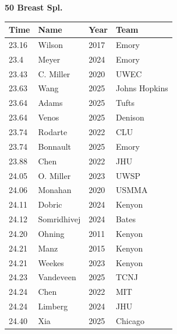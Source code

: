 \noindent\begin{minipage}[t]{0.98\textwidth}
\centering
\textbf{\textcolor{teamprimary}{50 Breast Spl.}}\par
\vspace{0.5em}
\centering
\small
\renewcommand{\arraystretch}{1.0}
\setlength{\tabcolsep}{4pt}
\begin{tabular}{@{}p{2.5cm}p{4.5cm}p{1.5cm}p{2.5cm}@{}}
\toprule
\textbf{Time} & \textbf{Name} & \textbf{Year} & \textbf{Team} \\
\midrule
23.16 & Wilson & 2017 & Emory \\
23.4 & Meyer & 2024 & Emory \\
23.43 & C. Miller & 2020 & UWEC \\
23.63 & Wang & 2025 & Johns Hopkins \\
23.64 & Adams & 2025 & Tufts \\
23.64 & Venos & 2025 & Denison \\
23.74 & Rodarte & 2022 & CLU \\
23.74 & Bonnault & 2025 & Emory \\
23.88 & Chen & 2022 & JHU \\
24.05 & O. Miller & 2023 & UWSP \\
24.06 & Monahan & 2020 & USMMA \\
24.11 & Dobric & 2024 & Kenyon \\
24.12 & Somridhivej & 2024 & Bates \\
24.20 & Ohning & 2011 & Kenyon \\
24.21 & Manz & 2015 & Kenyon \\
24.21 & Weekes & 2023 & Kenyon \\
24.23 & Vandeveen & 2025 & TCNJ \\
24.24 & Chen & 2022 & MIT \\
24.24 & Limberg & 2024 & JHU \\
24.40 & Xia & 2025 & Chicago \\
\bottomrule
\end{tabular}
\end{minipage}
\vspace{1.2em}

